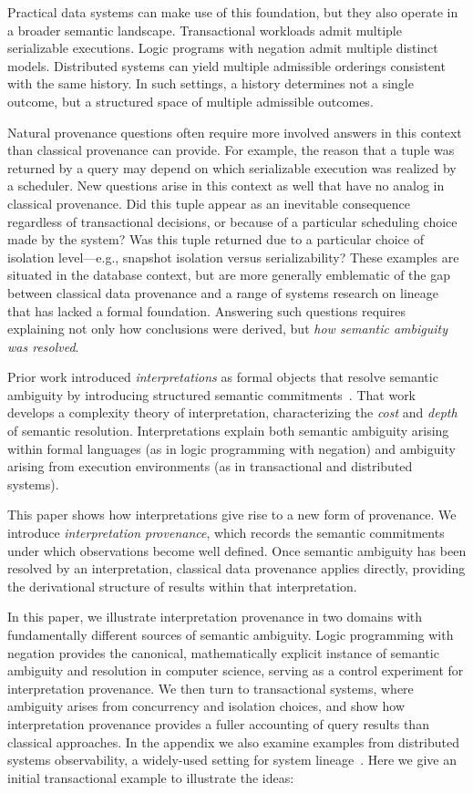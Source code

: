 \documentclass[acmsmall,nonacm]{acmart}
\theoremstyle{remark}
\numberwithin{definition}{section}
\numberwithin{theorem}{section}
\numberwithin{lemma}{section}
\numberwithin{corollary}{section}
\numberwithin{remark}{section}
\numberwithin{example}{section}
\numberwithin{observation}{section}
\numberwithin{assumption}{section}
\begin{document}
Practical data systems can make use of this foundation, but they also operate in a
broader semantic landscape.
Transactional workloads admit multiple serializable executions.
Logic programs with negation admit multiple distinct models.
Distributed systems can yield multiple admissible orderings consistent with the same
history.
In such settings, a history determines not a single outcome, but a structured
space of multiple admissible outcomes.

Natural provenance questions often require more involved answers in this context
than classical provenance can provide.
For example, the reason that a tuple was
returned by a query may depend on which serializable execution was realized by a scheduler.
New questions arise in this context as well that have no analog in classical provenance.
Did this tuple appear as an inevitable consequence regardless of transactional decisions,
or because of a particular scheduling choice made by the system?
Was this tuple returned due to a particular choice of isolation
level---e.g., snapshot isolation versus serializability?
These examples are situated in the database context, but are more 
generally emblematic of the gap between classical data provenance and a range of
systems research on 
lineage~\cite{sigelman2010dapper,seltzer2005provenance,bates2015trustworthy}
that has lacked a formal foundation.
Answering such questions requires explaining not only how conclusions were derived,
but \emph{how semantic ambiguity was resolved}.

Prior work introduced
\emph{interpretations} as formal objects that resolve semantic ambiguity by
introducing structured semantic commitments~\cite{hellerstein2026interpretation}.
That work develops a complexity theory of interpretation, characterizing the
\emph{cost} and \emph{depth} of semantic resolution.
Interpretations explain both semantic ambiguity arising within formal languages
(as in logic programming with negation) and ambiguity arising from execution
environments (as in transactional and distributed systems).

This paper shows how interpretations give rise to a new form of provenance.
We introduce \emph{interpretation provenance}, which records the semantic
commitments under which observations become well defined.
Once semantic ambiguity has been resolved by an interpretation, classical data
provenance applies directly, providing the derivational structure of results
within that interpretation.

In this paper, we illustrate interpretation provenance in two domains with fundamentally different
sources of semantic ambiguity.
Logic programming with negation provides the canonical, mathematically explicit
instance of semantic ambiguity and resolution in computer science, serving as a
control experiment for interpretation provenance.
We then turn to transactional systems, where ambiguity arises from concurrency and
isolation choices, and show how interpretation provenance provides a fuller
accounting of query results than classical approaches. In the appendix we also examine
examples from distributed systems observability, a widely-used setting for system
lineage~\cite{sigelman2010dapper}. Here we give an initial transactional example to
illustrate the ideas:
\end{document}
